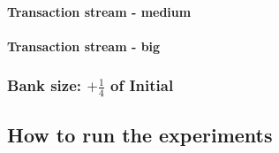 \paragraph{Transaction stream - medium\\}

\paragraph{Transaction stream - big\\}

\subsubsection{Bank size: $+\frac{1}{4}$ of Initial}

\subsection{How to run the experiments}

